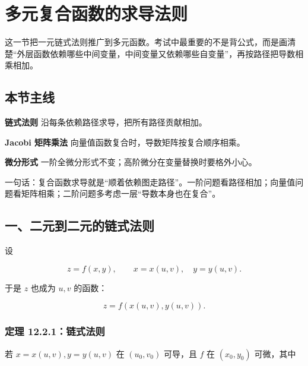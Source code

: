 \section{多元复合函数的求导法则}

这一节把一元链式法则推广到多元函数。考试中最重要的不是背公式，而是画清楚“外层函数依赖哪些中间变量，中间变量又依赖哪些自变量”，再按路径把导数相乘相加。

\subsection*{本节主线}

\begin{conceptbox}
\textbf{链式法则}
沿每条依赖路径求导，把所有路径贡献相加。
\end{conceptbox}

\begin{conceptbox}
\textbf{Jacobi 矩阵乘法}
向量值函数复合时，导数矩阵按复合顺序相乘。
\end{conceptbox}

\begin{conceptbox}
\textbf{微分形式}
一阶全微分形式不变；高阶微分在变量替换时要格外小心。
\end{conceptbox}

\begin{notebox}
一句话：复合函数求导就是“顺着依赖图走路径”。一阶问题看路径相加；向量值问题看矩阵相乘；二阶问题多考虑一层“导数本身也在复合”。
\end{notebox}

\subsection*{一、二元到二元的链式法则}

设

\[
      z=f(x,y),\qquad x=x(u,v),\quad y=y(u,v).
    \]

于是 \(z\) 也成为 \(u,v\) 的函数：

\[
      z=f(x(u,v),y(u,v)).
    \]

\subsubsection*{定理 12.2.1：链式法则}

若 \(x=x(u,v),y=y(u,v)\) 在 \((u_0,v_0)\) 可导，且 \(f\) 在 \((x_0,y_0)\) 可微，其中

